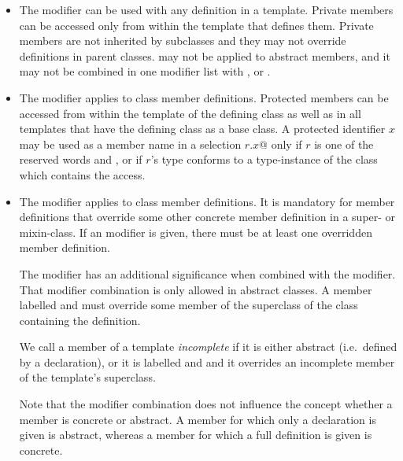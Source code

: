 \documentclass[a4paper,12pt,twoside,titlepage]{book}
\begin{document}
\begin{itemize}
\item
The  modifier can be used with any definition in a
template. Private members can be accessed only from within the template
that defines them.  
Private members are not inherited by subclasses and they
may not override definitions in parent classes.
 may not be applied to abstract members, and it
may not be combined in one modifier list with
,  or .
\item
The  modifier applies to class member definitions.
Protected members can be accessed from within the template of the defining
class as well as in all templates that have the defining class as a base class.
A protected identifier $x$ may be used as
a member name in a selection \lstinline@$r$.$x$@ only if $r$ is one of the reserved
words  and
, or if $r$'s type conforms to a type-instance of the class
which contains the access.
\item
The  modifier applies to class member definitions.  It
is mandatory for member definitions that override some other concrete
member definition in a super- or mixin-class. If an 
modifier is given, there must be at least one overridden member
definition.  

The  modifier has an additional significance when
combined with the  modifier.  That modifier combination
is only allowed in abstract classes.  A member
labelled  and  must override some
member of the superclass of the class containing the definition.

We call a member of a template {\em incomplete} if it is either
abstract (i.e.\ defined by a declaration), or it is labelled
 and  and it overrides an incomplete
member of the template's superclass.

Note that the  modifier combination does not
influence the concept whether a member is concrete or
abstract. A member for which only a declaration is given is abstract,
whereas a member for which a full definition is given is concrete.


\end{itemize}
\end{document}

